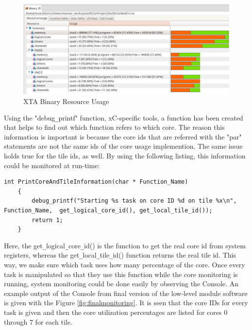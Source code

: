 \begin{figure}[!ht]
	\centering
	\captionsetup{justification=centering}
	\includegraphics[width=\textwidth]{content/images/binaryresourceusage.png}
	\caption{XTA Binary Resource Usage}
	\label{fig:binaryresourceusage}
\end{figure}

Using the "debug\texttt{\_}printf" function, xC-specific tools, a function has been created that helps to find out which function refers to which core. The reason this information is important is because the core ids that are referred with the "par" statements are not the same ids of the core usage implemention. The same issue holds true for the tile ids, as well. By using the following listing, this information could be monitored at run-time:

\newpage\begin{lstlisting}[style=xc]
	int PrintCoreAndTileInformation(char * Function_Name)
	{
		debug_printf("Starting %s task on core ID %d on tile %x\n", Function_Name, 	get_logical_core_id(), get_local_tile_id());
		return 1;
	}
\end{lstlisting}

Here, the get\texttt{\_}logical\texttt{\_}core\texttt{\_}id() is the function to get the real core id from system registers, whereas the get\texttt{\_}local\texttt{\_}tile\texttt{\_}id() function returns the real tile id. This way, we make sure which task uses how many percentage of the core. Once every task is manipulated so that they use this function while the core monitoring is running, system monitoring could be done easily by observing the Console. An example output of the Console from final version of the low-level module software is given with the Figure \ref{fig:finalmonitoring}. It is seen that the core IDs for every task is given and then the core utilization percentages are listed for cores 0 through 7 for each tile.

